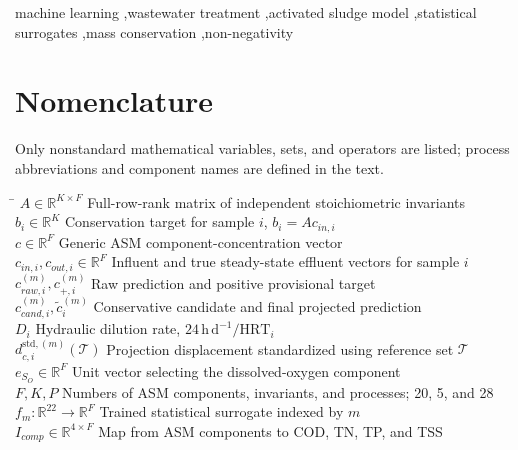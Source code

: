 \documentclass[a4paper,fleqn]{cas-sc}
\newcommand{\csvcomma}{,}
\begin{document}
\begin{keywords}
machine learning \sep wastewater treatment \sep activated sludge model \sep statistical surrogates \sep mass conservation \sep non-negativity
\end{keywords}

\maketitle

\section*{Nomenclature}
\noindent Only nonstandard mathematical variables, sets, and operators are listed; process abbreviations and component names are defined in the text.
\begin{tabbing}
\hspace{4.4cm} \= \kill
$A\in\mathbb{R}^{K\times F}$ \> Full-row-rank matrix of independent stoichiometric invariants \\
$b_i\in\mathbb{R}^{K}$ \> Conservation target for sample $i$\csvcomma{} $b_i=A c_{in\csvcomma{}i}$ \\
$c\in\mathbb{R}^{F}$ \> Generic ASM component-concentration vector \\
$c_{in\csvcomma{}i}\csvcomma{}c_{out\csvcomma{}i}\in\mathbb{R}^{F}$ \> Influent and true steady-state effluent vectors for sample $i$ \\
$c_{raw\csvcomma{}i}^{(m)}\csvcomma{}c_{+\csvcomma{}i}^{(m)}$ \> Raw prediction and positive provisional target \\
$c_{cand\csvcomma{}i}^{(m)}\csvcomma{}\tilde c_i^{(m)}$ \> Conservative candidate and final projected prediction \\
$D_i$ \> Hydraulic dilution rate\csvcomma{} $24\,\mathrm{h\,d}^{-1}/\mathrm{HRT}_i$ \\
$d_{c\csvcomma{}i}^{\mathrm{std}\csvcomma{}(m)}(\mathcal{T})$ \> Projection displacement standardized using reference set $\mathcal{T}$ \\
$e_{S_O}\in\mathbb{R}^{F}$ \> Unit vector selecting the dissolved-oxygen component \\
$F\csvcomma{}K\csvcomma{}P$ \> Numbers of ASM components\csvcomma{} invariants\csvcomma{} and processes; 20\csvcomma{} 5\csvcomma{} and 28 \\
$f_m:\mathbb{R}^{22}\to\mathbb{R}^{F}$ \> Trained statistical surrogate indexed by $m$ \\
$I_{comp}\in\mathbb{R}^{4\times F}$ \> Map from ASM components to COD\csvcomma{} TN\csvcomma{} TP\csvcomma{} and TSS \\

\end{tabbing}
\end{document}
